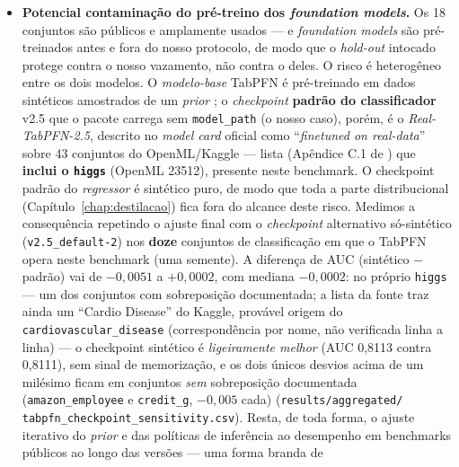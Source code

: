 \begin{itemize}
    demais (máximo $-4{,}3\%$). Os \emph{baselines} de DL em
    regressão estão, portanto, levemente subestimados nesses casos
    (\texttt{results/\allowbreak aggregated/\allowbreak
    dl\_\allowbreak target\_\allowbreak standardization.csv}).
  \item \textbf{Potencial contaminação do pré-treino dos \emph{foundation
    models}.} Os 18 conjuntos são públicos e amplamente usados --- e
    \emph{foundation models} são pré-treinados antes e fora do nosso
    protocolo, de modo que o \emph{hold-out} intocado protege contra o nosso
    vazamento, não contra o deles. O risco é heterogêneo entre os dois
    modelos. O
    \emph{modelo-base} TabPFN é pré-treinado em dados sintéticos
    amostrados de um \emph{prior} \citep{hollmann2025}; o
    \emph{checkpoint} \textbf{padrão do classificador} v2.5 que o
    pacote carrega sem \texttt{model\_path} (o nosso caso), porém, é o
    \emph{Real-TabPFN-2.5}, descrito no \emph{model card} oficial como
    ``\emph{finetuned on real-data}'' sobre 43 conjuntos do
    OpenML/Kaggle --- lista (Apêndice C.1 de \citealp{priorlabs2025})
    que \textbf{inclui o \texttt{higgs}} (OpenML 23512), presente neste
    benchmark. O checkpoint padrão do \emph{regressor} é sintético
    puro, de modo que toda a parte distribucional
    (Capítulo~\ref{chap:destilacao}) fica fora do alcance deste risco.
    Medimos a consequência repetindo o ajuste final com o
    \emph{checkpoint} alternativo só-sintético
    (\texttt{v2.5\_default-2}) nos \textbf{doze} conjuntos de
    classificação em que o TabPFN opera neste benchmark (uma semente).
    A diferença de AUC (sintético $-$ padrão) vai de $-0{,}0051$ a
    $+0{,}0002$, com mediana $-0{,}0002$: no próprio \texttt{higgs}
    --- um dos conjuntos com sobreposição documentada; a lista da
    fonte traz ainda um ``Cardio Disease'' do Kaggle, provável origem
    do \texttt{cardiovascular\_disease} (correspondência por nome, não
    verificada linha a linha) --- o checkpoint sintético é
    \emph{ligeiramente melhor} (AUC 0,8113 contra 0,8111), sem sinal
    de memorização, e os dois únicos desvios acima de um milésimo
    ficam em conjuntos \emph{sem} sobreposição documentada
    (\texttt{amazon\_\allowbreak employee} e \texttt{credit\_g},
    $-0{,}005$ cada)
    (\texttt{results/\allowbreak aggregated/\allowbreak
    tabpfn\_\allowbreak checkpoint\_\allowbreak sensitivity.csv}). Resta,
    de toda forma, o ajuste iterativo do
    \emph{prior} e das políticas de inferência ao desempenho em benchmarks
    públicos ao longo das versões --- uma forma branda de

\end{itemize}
